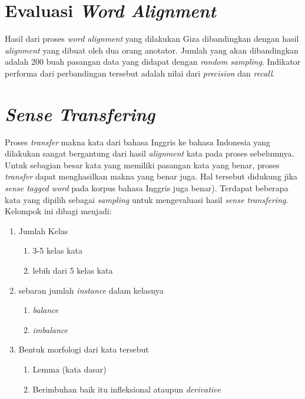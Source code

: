 \section{Evaluasi \textit{Word Alignment}}

Hasil dari proses \textit{word alignment} yang dilakukan Giza dibandingkan dengan hasil \textit{alignment} yang dibuat oleh dua orang anotator. Jumlah yang akan dibandingkan adalah 200 buah pasangan data yang didapat dengan \textit{random sampling}. Indikator performa dari perbandingan tersebut adalah nilai dari \textit{precision} dan \textit{recall}.

\section{\textit{Sense Transfering}}

Proses \textit{transfer} makna kata dari bahasa Inggris ke bahasa Indonesia yang dilakukan sangat bergantung dari hasil \textit{alignment} kata pada proses sebelumnya. Untuk sebagian besar kata yang memiliki pasangan kata yang benar, proses \textit{transfer} dapat menghasilkan makna yang benar juga. Hal tersebut didukung jika \textit{sense tagged word} pada korpus bahasa Inggris juga benar). Terdapat beberapa kata yang dipilih sebagai \textit{sampling} untuk mengevaluasi hasil \textit{sense transfering}. Kelompok ini dibagi menjadi:

\begin{enumerate}
	\item Jumlah Kelas
	\begin{enumerate}
		\item 3-5 kelas kata
		\item lebih dari 5 kelas kata
	\end{enumerate}
	\item sebaran jumlah \textit{instance} dalam kelasnya
	\begin{enumerate}
		\item \textit{balance}
		\item \textit{imbalance}
	\end{enumerate}
	\item Bentuk morfologi dari kata tersebut
	\begin{enumerate}
		\item Lemma (kata dasar)
		\item Berimbuhan baik itu infleksional ataupun \textit{derivative}
	\end{enumerate}
\end{enumerate}

